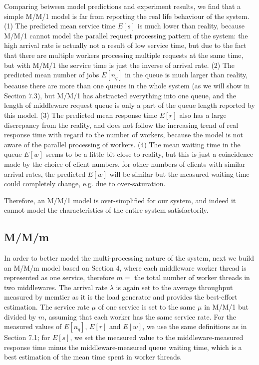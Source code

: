 Comparing between model predictions and experiment results, we find that a simple M/M/1 model is far from reporting the real life behaviour of the system. (1) The predicted mean service time $E[s]$ is much lower than reality, because M/M/1 cannot model the parallel request processing pattern of the system: the high arrival rate is actually not a result of low service time, but due to the fact that there are multiple workers processing multiple requests at the same time, but with M/M/1 the service time is just the inverse of arrival rate. (2) The predicted mean number of jobs $E[n_q]$ in the queue is much larger than reality, because there are more than one queues in the whole system (as we will show in Section 7.3), but M/M/1 has abstracted everything into one queue, and the length of middleware request queue is only a part of the queue length reported by this model. (3) The predicted mean response time $E[r]$ also has a large discrepancy from the reality, and does not follow the increasing trend of real response time with regard to the number of workers, because the model is not aware of the parallel processing of workers. (4) The mean waiting time in the queue $E[w]$ seems to be a little bit close to reality, but this is just a coincidence made by the choice of client numbers, for other numbers of clients with similar arrival rates, the predicted $E[w]$ will be similar but the measured waiting time could completely change, e.g. due to over-saturation.

Therefore, an M/M/1 model is over-simplified for our system, and indeed it cannot model the characteristics of the entire system satisfactorily.

\subsection{M/M/m}

In order to better model the multi-processing nature of the system, next we build an M/M/m model based on Section 4, where each middleware worker thread is represented as one service, therefore $m=$ the total number of worker threads in two middlewares. The arrival rate $\lambda$ is again set to the average throughput measured by memtier as it is the load generator and provides the best-effort estimation. The service rate $\mu$ of one service is set to the same $\mu$ in M/M/1 but divided by $m$, assuming that each worker has the same service rate. For the measured values of $E[n_q]$, $E[r]$ and $E[w]$, we use the same definitions as in Section 7.1; for $E[s]$, we set the measured value to the middleware-measured response time minus the middleware-measured queue waiting time, which is a best estimation of the mean time spent in worker threads.

